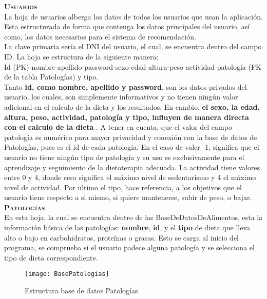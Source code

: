 \textbf{\textsc{Usuarios}}\\
La hoja de usuarios alberga los datos de todos los usuarios que usan la aplicación. Esta estructurada de forma que contenga los datos principales del usuario, así como, los datos necesarios para el sistema de recomendación. \\
La clave primaria sería el DNI del usuario, el cual, se encuentra dentro del campo ID. La hoja se estructura de la siguiente manera:\\
Id (PK)-nombre-apellido-password-sexo-edad-altura-peso-actividad-patología (FK de la tabla Patologías) y tipo.\\
Tanto \textbf{id, como nombre, apellido y password}, son los datos privados del usuario, los cuales, son simplemente informativos y no tienen ningún valor adicional en el calculo de la dieta y los resultados. En cambio, \textbf{el sexo, la edad, altura, peso, actividad, patología y tipo, influyen de manera directa con el calculo de la dieta} . A tener en cuenta, que el valor del campo patología es numérico para mayor privacidad y conexión con la base de datos de Patologías, pues es el id de cada patología. En el caso de valer -1, significa que el usuario no tiene ningún tipo de patología y su uso es exclusivamente para el aprendizaje y seguimiento de la dietoterapia adecuada. La actividad tiene valores entre 0 y 4, donde cero significa el máximo nivel de sedentarismo y 4 el máximo nivel de actividad. Por ultimo el tipo, hace referencia, a los objetivos que el usuario tiene respecto a si mismo, si quiere mantenerse, subir de peso, o bajar.\\

\textbf{\textsc{Patologías}}\\
En esta hoja, la cual se encuentra dentro de las BaseDeDatosDeAlimentos, esta la información básica de las patologías: \textbf{nombre}, \textbf{id}, y el \textbf{tipo} de dieta que lleva alto o bajo en carbohidratos, proteínas o grasas. Esto se carga al inicio del programa, se comprueba si el usuario padece alguna patología y se selecciona el tipo de dieta correspondiente.\\
\begin{figure}[htb]
\centering
\texttt{[image: BasePatologias]} 
\caption{Estructura base de datos Patologías}
\end{figure}

